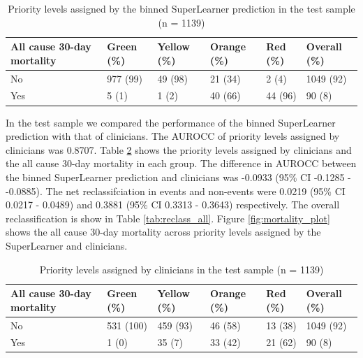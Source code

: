 \documentclass[10pt,letterpaper]{article}\usepackage[]{graphicx}\usepackage[]{color}
\begin{document}
\begin{table}[ht]
\centering
\caption{Priority levels assigned by the binned SuperLearner prediction in the test sample (n = 1139)} 
\label{tab:superlearner_priorities_test}
\begin{tabular}{llllll}
  \hline
All cause 30-day mortality & Green (\%) & Yellow (\%) & Orange (\%) & Red (\%) & Overall (\%) \\ 
  \hline
No & 977 (99) & 49 (98) & 21 (34) & 2 (4) & 1049 (92) \\ 
  Yes & 5 (1) & 1 (2) & 40 (66) & 44 (96) & 90 (8) \\ 
   \hline
\end{tabular}
\end{table}


In the test sample we compared the performance of the binned SuperLearner
prediction with that of clinicians. The AUROCC of priority levels assigned by
clinicians was 0.8707. Table \ref{tab:clinicians_priorities_test}
shows the priority levels assigned by clinicians and the all cause 30-day
mortality in each group. The difference in AUROCC between the binned
SuperLearner prediction and clinicians was
-0.0933 (95\% CI -0.1285 - -0.0885). The net reclassifciation in events and
non-events were 0.0219 (95\% CI 0.0217 - 0.0489) and 0.3881 (95\% CI 0.3313 - 0.3643) respectively. The overall
reclassification is show in Table \ref{tab:reclass_all}. Figure
\ref{fig:mortality_plot} shows the all cause 30-day mortality across priority
levels assigned by the SuperLearner and clinicians.

\begin{table}[ht]
\centering
\caption{Priority levels assigned by clinicians in the test sample (n = 1139)} 
\label{tab:clinicians_priorities_test}
\begin{tabular}{llllll}
  \hline
All cause 30-day mortality & Green (\%) & Yellow (\%) & Orange (\%) & Red (\%) & Overall (\%) \\ 
  \hline
No & 531 (100) & 459 (93) & 46 (58) & 13 (38) & 1049 (92) \\ 
  Yes & 1 (0) & 35 (7) & 33 (42) & 21 (62) & 90 (8) \\ 
   \hline
\end{tabular}
\end{table}
\end{document}
